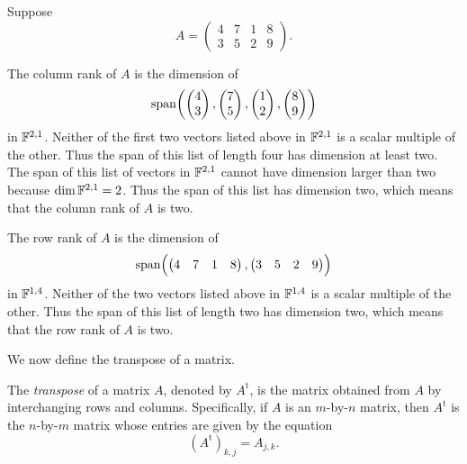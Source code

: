 \begin{example}\label{ax:3.53}
Suppose
\[ A = \begin{pmatrix} 4 & 7 & 1 & 8\\ 3 & 5 & 2 & 9 \end{pmatrix}. \]

The column rank of $A$ is the dimension of
\[ \operatorname{span}\biggl(\begin{pmatrix} 4\\ 3 \end{pmatrix},
   \begin{pmatrix} 7\\ 5 \end{pmatrix},
   \begin{pmatrix} 1\\ 2 \end{pmatrix},
   \begin{pmatrix} 8\\ 9 \end{pmatrix}\biggr) \]
in $\mathbb{F}^{2,1}$. Neither of the first two vectors listed above in $\mathbb{F}^{2,1}$ is a
scalar multiple of the other. Thus the span of this list of length four has
dimension at least two. The span of this list of vectors in $\mathbb{F}^{2,1}$ cannot
have dimension larger than two because $\operatorname{dim}\mathbb{F}^{2,1}=2$. Thus the span of this
list has dimension two, which means that the column rank of $A$ is two.

The row rank of $A$ is the dimension of
\[ \operatorname{span}\Bigl(\begin{pmatrix} 4 & 7 & 1 & 8 \end{pmatrix},
   \begin{pmatrix} 3 & 5 & 2 & 9 \end{pmatrix}\Bigr) \]
in $\mathbb{F}^{1,4}$. Neither of the two vectors listed above in $\mathbb{F}^{1,4}$ is a
scalar multiple of the other. Thus the span of this list of length two has
dimension two, which means that the row rank of $A$ is two.
\end{example}

We now define the transpose of a matrix.

\begin{definition}\label{ax:3.54}
The \emph{transpose} of a matrix $A$, denoted by $A^{\mathrm{t}}$, is the
matrix obtained from $A$ by interchanging rows and columns. Specifically, if
$A$ is an $m$-by-$n$ matrix, then $A^{\mathrm{t}}$ is the $n$-by-$m$ matrix
whose entries are given by the equation
\[ (A^{\mathrm{t}})_{k,j} = A_{j,k}. \]
\end{definition}

